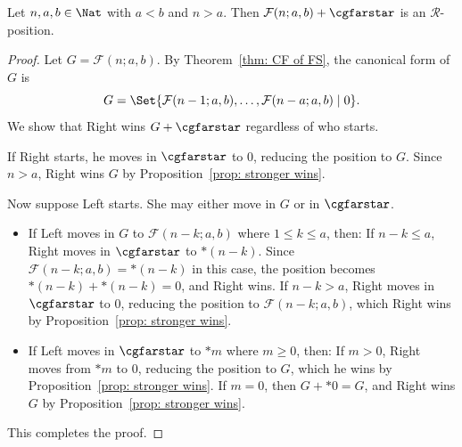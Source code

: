 \documentclass[oneside,reqno]{amsart}
\newcommand{\fs}{\mathcal{F}}
\newcommand{\rp}{\mathscr{R}}
\begin{document}
\begin{lemma}\label{lem: outcome of G+farstar}
Let $n,a,b\in\Nat$ with $a<b$ and $n>a$. Then $\fs(n;a,b)+\cgfarstar$ is an $\rp$-position.
\end{lemma}

\begin{proof}
Let $G=\fs(n;a,b)$. By Theorem~\ref{thm: CF of FS}, the canonical form of $G$ is
\[
G=\Set{\fs(n-1;a,b), \dots, \fs(n-a;a,b)\mid 0}.
\]
We show that Right wins $G+\cgfarstar$ regardless of who starts.

If Right starts, he moves in $\cgfarstar$ to $0$, reducing the position to $G$. Since $n>a$, Right wins $G$ by Proposition~\ref{prop: stronger wins}.

Now suppose Left starts. She may either move in $G$ or in $\cgfarstar$.
\begin{itemize}
\item If Left moves in $G$ to $\fs(n-k;a,b)$ where $1\le k\le a$, then:
If $n-k\le a$, Right moves in $\cgfarstar$ to $*(n-k)$. Since $\fs(n-k;a,b)=*(n-k)$ in this case, the position becomes $*(n-k)+*(n-k)=0$, and Right wins. If $n-k>a$, Right moves in $\cgfarstar$ to $0$, reducing the position to $\fs(n-k;a,b)$, which Right wins by Proposition~\ref{prop: stronger wins}.

\item If Left moves in $\cgfarstar$ to $*m$ where $m\ge 0$, then:
If $m>0$, Right moves from $*m$ to $0$, reducing the position to $G$, which he wins by Proposition~\ref{prop: stronger wins}. If $m=0$, then $G+*0=G$, and Right wins $G$ by Proposition~\ref{prop: stronger wins}.
\end{itemize}
This completes the proof.
\end{proof}



    
\end{document}
